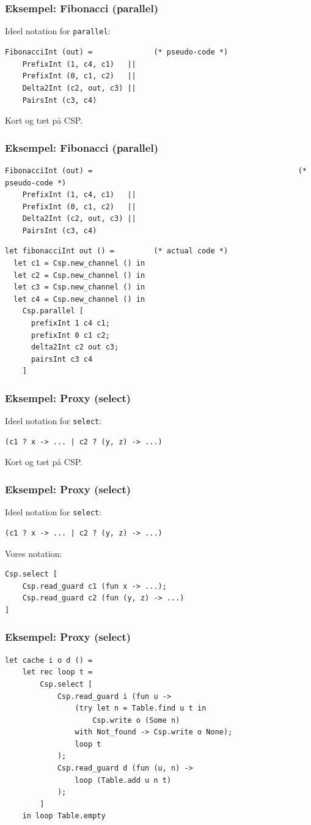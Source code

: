 \documentclass{beamer}
\begin{document}
\section[Eksempler]{}
\begin{frame}[fragile]
  \frametitle{Eksempel: Fibonacci (parallel)}
Ideel notation for \verb|parallel|:

\begin{verbatim}
FibonacciInt (out) =              (* pseudo-code *)
    PrefixInt (1, c4, c1)   ||
    PrefixInt (0, c1, c2)   ||
    Delta2Int (c2, out, c3) ||
    PairsInt (c3, c4)
\end{verbatim}

Kort og tæt på CSP.
\end{frame}
\begin{frame}[fragile]
  \frametitle{Eksempel: Fibonacci (parallel)}
{\tiny
\begin{verbatim}
FibonacciInt (out) =                                               (* pseudo-code *)
    PrefixInt (1, c4, c1)   ||
    PrefixInt (0, c1, c2)   ||
    Delta2Int (c2, out, c3) ||
    PairsInt (c3, c4)
\end{verbatim}
}
\begin{verbatim}
let fibonacciInt out () =         (* actual code *)
  let c1 = Csp.new_channel () in
  let c2 = Csp.new_channel () in
  let c3 = Csp.new_channel () in
  let c4 = Csp.new_channel () in
    Csp.parallel [
      prefixInt 1 c4 c1;
      prefixInt 0 c1 c2;
      delta2Int c2 out c3;
      pairsInt c3 c4
    ]
\end{verbatim}
\end{frame}
\begin{frame}[fragile]
  \frametitle{Eksempel: Proxy (select)}
Ideel notation for \verb|select|:
\begin{verbatim}
(c1 ? x -> ... | c2 ? (y, z) -> ...)
\end{verbatim}
Kort og tæt på CSP.
\end{frame}
\begin{frame}[fragile]
  \frametitle{Eksempel: Proxy (select)}
Ideel notation for \verb|select|:
\begin{verbatim}
(c1 ? x -> ... | c2 ? (y, z) -> ...)
\end{verbatim}
Vores notation:
\begin{verbatim}
Csp.select [
    Csp.read_guard c1 (fun x -> ...);
    Csp.read_guard c2 (fun (y, z) -> ...)
]
\end{verbatim}
\end{frame}
\begin{frame}[fragile]
  \frametitle{Eksempel: Proxy (select)}
\begin{verbatim}
let cache i o d () =
    let rec loop t =
        Csp.select [
            Csp.read_guard i (fun u ->
                (try let n = Table.find u t in
                    Csp.write o (Some n)
                with Not_found -> Csp.write o None);
                loop t
            );
            Csp.read_guard d (fun (u, n) ->
                loop (Table.add u n t)
            );
        ]
    in loop Table.empty
\end{verbatim}
\end{frame}
\end{document}
